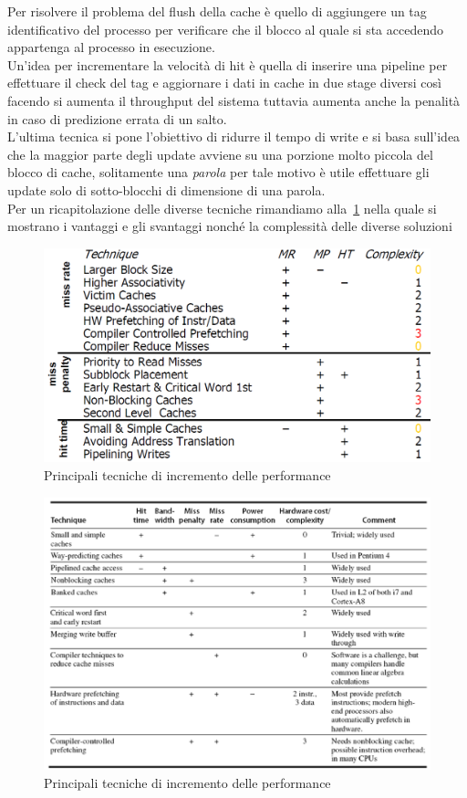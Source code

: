 Per risolvere il problema del flush della cache è quello di aggiungere un tag identificativo del processo per verificare che il blocco al quale si sta accedendo appartenga al processo in esecuzione.\\
Un'idea per incrementare la velocità di hit è quella di inserire una pipeline per effettuare il check del tag e aggiornare i dati in cache in due stage diversi così facendo si aumenta il throughput del sistema tuttavia aumenta anche la penalità in caso di predizione errata di un salto.\\
L'ultima tecnica si pone l'obiettivo di ridurre il tempo di write e si basa sull'idea che la maggior parte degli update avviene su una porzione molto piccola del blocco di cache, solitamente una \emph{parola} per tale motivo è utile effettuare gli update solo di sotto-blocchi di dimensione di una parola.\\
Per un ricapitolazione delle diverse tecniche rimandiamo alla \figurename\,\ref{fig:performancerecap} nella quale si mostrano i vantaggi e gli svantaggi nonché la complessità delle diverse soluzioni
\begin{figure}[htb]
\centering
\includegraphics[scale=0.5]{img/performancerecap1.png}
\caption{Principali tecniche di incremento delle performance}\label{fig:performancerecap}
\end{figure}

\begin{figure}[htb]
\centering
\includegraphics[scale=0.5]{img/performancerecap2.png}
\caption{Principali tecniche di incremento delle performance}
\end{figure}
